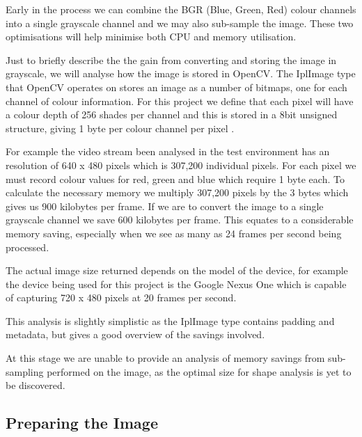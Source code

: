 Early in the process we can combine the BGR (Blue, Green, Red) colour channels into a single grayscale channel and we may also sub-sample the image. These two optimisations will help minimise both CPU and memory utilisation.

Just to briefly describe the the gain from converting and storing the image in grayscale, we will analyse how the image is stored in OpenCV. The IplImage type that OpenCV operates on stores an image as a number of bitmaps, one for each channel of colour information. For this project we define that each pixel will have a colour depth of 256 shades per channel and this is stored in a 8bit unsigned structure, giving 1 byte per colour channel per pixel  \cite{morganIPL06}.

For example the video stream been analysed in the test environment has an resolution of 640 x 480 pixels which is 307,200 individual pixels. For each pixel we must record colour values for red, green and blue which require 1 byte each. To calculate the necessary memory we multiply 307,200 pixels by the 3 bytes which gives us 900 kilobytes per frame. If we are to convert the image to a single grayscale channel we save 600 kilobytes per frame. This equates to a considerable memory saving, especially when we see as many as 24 frames per second being processed.

The actual image size returned depends on the model of the device, for example the device being used for this project is the Google Nexus One which is capable of capturing 720 x 480 pixels at 20 frames per second.

This analysis is slightly simplistic as the IplImage type contains padding and metadata, but gives a good overview of the savings involved.

At this stage we are unable to provide an analysis of memory savings from sub-sampling performed on the image, as the optimal size for shape analysis is yet to be discovered.


\subsection{Preparing the Image}

